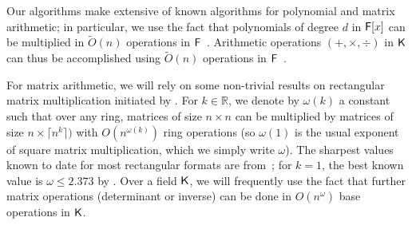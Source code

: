 Our algorithms make extensive of known algorithms for polynomial and matrix
arithmetic; in particular, we use the fact that polynomials of degree $d$
in ${\mathsf{F}}[x]$ can be multiplied in $\tilde{O}(n)$ operations in
${\mathsf{F}}$~\cite{ScSt71}. Arithmetic operations $(+,\times,\div)$ in ${\mathsf{K}}$ can
thus be accomplished using $\tilde{O}(n)$ operations in
${\mathsf{F}}$~\cite{vzGathen13}.

For matrix arithmetic, we will rely on some non-trivial results on
rectangular matrix multiplication initiated by . For
$k \in \mathbb{R}$, we denote by $\omega(k)$ a constant such that over any
ring, matrices of size $n\times n$ can be multiplied by matrices of size
$n\times \lceil n^k \rceil)$ with $O(n^{\omega(k)})$ ring
operations (so $\omega(1)$ is the usual exponent of square matrix
multiplication, which we simply write $\omega$).  The sharpest values known
to date for most rectangular formats are from~\cite{LeGall}; for $k=1$, the
best known value is $\omega \le 2.373$ by . Over a field ${\mathsf{K}}$,
we will frequently use the fact that further matrix operations (determinant
or inverse) can be done in $O(n^\omega)$ base operations in ${\mathsf{K}}$.


